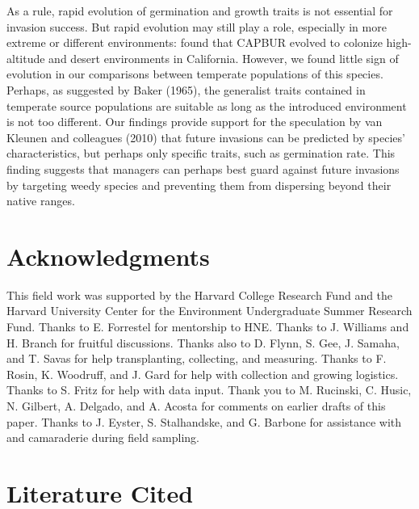 \documentclass[12pt]{article}\usepackage[]{graphicx}\usepackage[]{color}
\begin{document}
As a rule, rapid evolution of germination and growth traits is not essential for invasion success. But rapid evolution may still play a role, especially in more extreme or different environments:  \textcite{Linde2001} found that CAPBUR evolved to colonize high-altitude and desert environments in California. However, we found little sign of evolution in our comparisons between temperate populations of this species. Perhaps, as suggested by Baker (1965), the generalist traits contained in temperate source populations are suitable as long as the introduced environment is not too different. Our findings provide support for  the speculation by van Kleunen and colleagues (2010) that future invasions can be predicted by species' characteristics, but perhaps only specific traits, such as germination rate. This finding suggests that managers can perhaps best guard against future invasions by targeting weedy species and preventing them from dispersing beyond their native ranges. 

	
\section{Acknowledgments}
This field work was supported by the Harvard College Research Fund and the Harvard University Center for the Environment Undergraduate Summer Research Fund. Thanks to E. Forrestel for mentorship to HNE. Thanks to J. Williams and H. Branch for fruitful discussions. Thanks also to D. Flynn, S. Gee, J. Samaha, and T. Savas for help transplanting, collecting, and measuring. Thanks to F. Rosin, K. Woodruff, and J. Gard for help with collection and growing logistics. Thanks to S. Fritz for help with data input. Thank you to M. Rucinski, C. Husic, N. Gilbert, A. Delgado, and A. Acosta for comments on earlier drafts of this paper. Thanks to J. Eyster, S. Stalhandske, and G. Barbone for assistance with and camaraderie during field sampling. 

	

\section{Literature Cited}
\printbibliography
\end{document}
